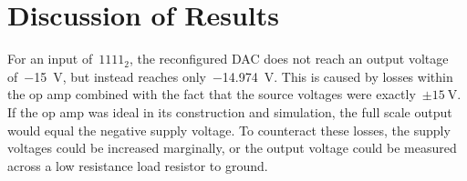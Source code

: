 \section{Discussion of Results}
For an input of~$1111_2$, the reconfigured DAC does not reach an output voltage
of~\SI{-15}{\volt}, but instead reaches only~\SI{-14.974}{\volt}.  This is
caused by losses within the op amp combined with the fact that the source
voltages were exactly~$\pm\SI{15}{\volt}$.  If the op amp was ideal in its
construction and simulation, the full scale output would equal the negative
supply voltage.  To counteract these losses, the supply voltages could be
increased marginally, or the output voltage could be measured across a low
resistance load resistor to ground.

